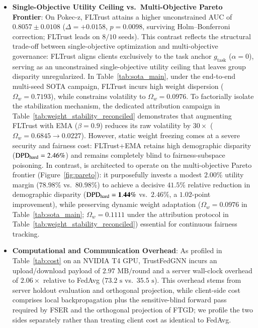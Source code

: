 \begin{itemize}[leftmargin=*]
    \item \textbf{Single-Objective Utility Ceiling vs.\ Multi-Objective Pareto Frontier}: On Pokec-z, FLTrust attains a higher unconstrained AUC of $0.8057 \pm 0.0108$ ($\Delta = +0.0158$, $p = 0.0098$, surviving Holm--Bonferroni correction; FLTrust leads on $8/10$ seeds). This contrast reflects the structural trade-off between single-objective optimization and multi-objective governance: FLTrust aligns clients exclusively to the task anchor $g_{\mathrm{task}}$ ($\alpha=0$), serving as an unconstrained single-objective utility ceiling that leaves group disparity unregularized. In Table~\ref{tab:sota_main}, under the end-to-end multi-seed SOTA campaign, FLTrust incurs high weight dispersion ($\Omega_w = 0.7193$), while \MethodName{} constrains volatility to $\Omega_w = 0.0976$. To factorially isolate the stabilization mechanism, the dedicated attribution campaign in Table~\ref{tab:weight_stability_reconciled} demonstrates that augmenting FLTrust with EMA ($\beta=0.9$) reduces its raw volatility by $30\times$ ($\Omega_w = 0.6845 \to 0.0227$). However, static weight freezing comes at a severe security and fairness cost: FLTrust+EMA retains high demographic disparity ($\mathrm{DPD}_{\mathrm{hard}} = 2.46\%$) and remains completely blind to fairness-subspace poisoning. In contrast, \MethodName{} is architected to operate on the multi-objective Pareto frontier (Figure~\ref{fig:pareto}): it purposefully invests a modest $2.00\%$ utility margin ($78.98\%$ vs.\ $80.98\%$) to achieve a decisive $\mathbf{41.5\%}$ relative reduction in demographic disparity ($\mathrm{DPD}_{\mathrm{hard}} = \mathbf{1.44\%}$ vs.\ $2.46\%$, a $1.02$-point improvement), while preserving dynamic weight adaptation ($\Omega_w = 0.0976$ in Table~\ref{tab:sota_main}; $\Omega_w = 0.1111$ under the attribution protocol in Table~\ref{tab:weight_stability_reconciled}) essential for continuous fairness tracking.
    \item \textbf{Computational and Communication Overhead}: As profiled in Table~\ref{tab:cost} on an NVIDIA T4 GPU, TrustFedGNN incurs an upload/download payload of $2.97\text{ MB/round}$ and a server wall-clock overhead of $2.06\times$ relative to FedAvg ($73.2\text{ s}$ vs.\ $35.5\text{ s}$). This overhead stems from server holdout evaluation and orthogonal projection, while client-side cost comprises local backpropagation plus the sensitive-blind forward pass required by FSER and the orthogonal projection of FTGD; we profile the two sides separately rather than treating client cost as identical to FedAvg.
\end{itemize}

